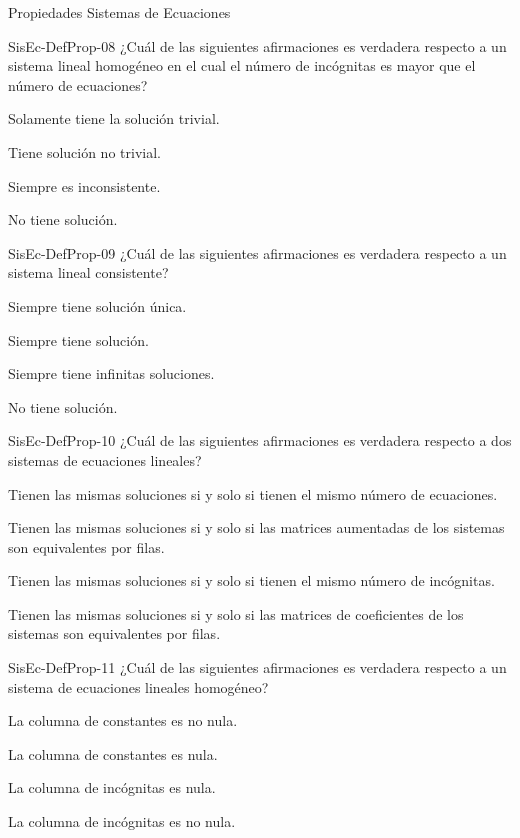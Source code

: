 \documentclass[a4,11pt]{aleph-notas}
\begin{document}
\begin{quiz}{Propiedades Sistemas de Ecuaciones}
\begin{multi}[]%
    {SisEc-DefProp-08}
    ¿Cuál de las siguientes afirmaciones es verdadera respecto a un sistema lineal homogéneo en el cual el número de incógnitas es mayor que el número de ecuaciones?
    \item Solamente tiene la solución trivial.
    \item* Tiene solución no trivial.
    \item Siempre es inconsistente.
    \item No tiene solución.
\end{multi}

\begin{multi}[]%
    {SisEc-DefProp-09}
    ¿Cuál de las siguientes afirmaciones es verdadera respecto a un sistema lineal consistente?
    \item Siempre tiene solución única.
    \item* Siempre tiene solución.
    \item Siempre tiene infinitas soluciones.
    \item No tiene solución.
\end{multi}

\begin{multi}[]%
    {SisEc-DefProp-10}
    ¿Cuál de las siguientes afirmaciones es verdadera respecto a dos sistemas de ecuaciones lineales?
    \item Tienen las mismas soluciones si y solo si tienen el mismo número de ecuaciones.
    \item* Tienen las mismas soluciones si y solo si las matrices aumentadas de los sistemas son equivalentes por filas.
    \item Tienen las mismas soluciones si y solo si tienen el mismo número de incógnitas.
    \item Tienen las mismas soluciones si y solo si las matrices de coeficientes de los sistemas son equivalentes por filas.
\end{multi}

\begin{multi}[]%
    {SisEc-DefProp-11}
    ¿Cuál de las siguientes afirmaciones es verdadera respecto a un sistema de ecuaciones lineales homogéneo?
    \item La columna de constantes es no nula.
    \item* La columna de constantes es nula.
    \item La columna de incógnitas es nula.
    \item La columna de incógnitas es no nula.
\end{multi}


\end{quiz}
\end{document}
